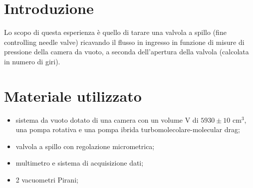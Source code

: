 \section{Introduzione}

Lo scopo di questa esperienza è quello di tarare una valvola a spillo (fine controlling needle valve) ricavando il flusso in ingresso in funzione di misure di pressione della camera da vuoto, a seconda dell'apertura della valvola (calcolata in numero di giri).


\section{Materiale utilizzato}

\begin{itemize}
	\item{sistema da vuoto dotato di una camera con un volume V di $5930 \pm 10$ \si{\centi\metre}$^3$, una pompa rotativa e una pompa ibrida turbomolecolare-molecular drag;}
	\item{valvola a spillo con regolazione micrometrica;}
	\item{multimetro e sistema di acquisizione dati;}
	\item{2 vacuometri Pirani;}
\end{itemize}